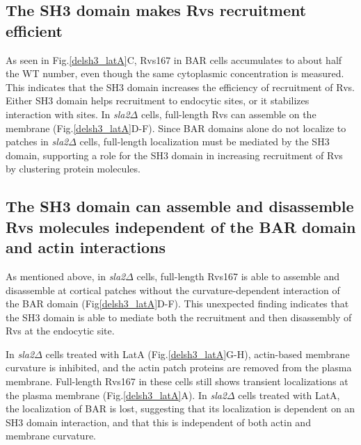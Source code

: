 \subsection{The SH3 domain makes Rvs recruitment efficient} 
As seen in Fig.\ref{delsh3_latA}C, Rvs167 in BAR cells accumulates to about half the WT number, even though the same cytoplasmic concentration is measured. This indicates that the SH3 domain increases the efficiency of recruitment of Rvs. Either SH3 domain helps recruitment to endocytic sites, or it stabilizes interaction with sites. In \textit{sla2$\Delta$}  cells, full-length Rvs can assemble on the membrane (Fig.\ref{delsh3_latA}D-F). Since BAR domains alone do not localize to patches in \textit{sla2$\Delta$}  cells, full-length localization must be mediated by the SH3 domain, supporting a role for the SH3 domain in increasing recruitment of Rvs by clustering protein molecules. 


\subsection{The SH3 domain can assemble and disassemble Rvs molecules independent of the BAR domain and actin interactions} 
As mentioned above, in \textit{sla2$\Delta$}  cells, full-length Rvs167 is able to assemble and disassemble at cortical patches without the curvature-dependent interaction of the BAR domain (Fig\ref{delsh3_latA}D-F). This unexpected finding indicates that the SH3 domain is able to mediate both the recruitment and then disassembly of Rvs at the endocytic site. 


	\vspace{5mm}
In \textit{sla2$\Delta$}  cells treated with LatA (Fig.\ref{delsh3_latA}G-H), actin-based membrane curvature is inhibited, and the actin patch proteins are removed from the plasma membrane. Full-length Rvs167 in these cells still shows transient localizations at the plasma membrane (Fig.\ref{delsh3_latA}A). In \textit{sla2$\Delta$}  cells treated with LatA, the localization of BAR is lost, suggesting that its localization is dependent on an SH3 domain interaction, and that this is independent of both actin and membrane curvature. 


